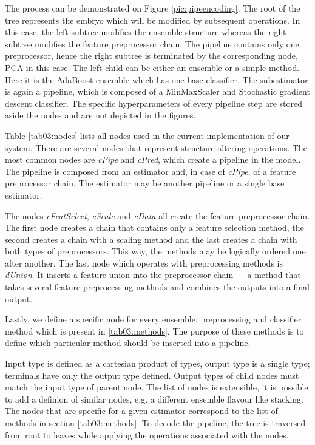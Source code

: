 The process can be demonstrated on Figure
\ref{pic:pipeencoding}. The root of the tree represents the embryo which will
be modified by subsequent operations. In this case, the left subtree modifies
the ensemble structure whereas the right subtree modifies the feature
preprocessor chain. The pipeline contains only one preprocessor, hence the
right subtree is terminated by the corresponding node, PCA in this case. The
left child can be
either an ensemble or a simple method. Here it is the AdaBoost ensemble which
has one base classifier. The subestimator is again a pipeline, which is composed
of a MinMaxScaler and Stochastic gradient descent classifier. The specific
hyperparameters of every pipeline step are stored aside the nodes and are not
depicted in the figures.

\label{sec:decoding}
Table \ref{tab03:nodes} lists all nodes used in the current implementation of
our system. There are several nodes that represent structure altering
operations. The most common nodes are \emph{cPipe} and \emph{cPred}, which
create a pipeline in the model. The pipeline is composed from an estimator
and, in case of \emph{cPipe}, of a feature preprocessor chain. The estimator
may be another pipeline or a single base estimator.

The nodes \emph{cFeatSelect}, \emph{cScale} and \emph{cData} all create the feature
preprocessor chain. The first node creates a chain that contains only a
feature selection method, the second creates a chain with a scaling method
and the last creates a chain with both types of preprocessors. This way, the
methods may be logically ordered one after another. The last node which
operates with preprocessing methods is \emph{dUnion}. It inserts a feature union
into the preprocessor chain --- a method that takes several feature
preprocessing methods and combines the outputs into a final output.

Lastly, we define a specific node for every ensemble, preprocessing and
classifier method which is present in \ref{tab03:methods}. The purpose of
these methods is to define which particular method should be inserted into
a pipeline.

Input type is defined as a cartesian product of types, output type
is a single type; terminals have only the output type defined. Output types of
child nodes must match the input type of parent node. The list of nodes
is extensible,
it is possible to add a definion of similar nodes, e.g. a different ensemble
flavour like stacking. The nodes that are specific for a given estimator
correspond to the list of methods in section \ref{tab03:methods}. To decode
the pipeline, the tree is traversed from root to leaves while applying the
operations associated with the nodes.

